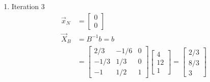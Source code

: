 \documentclass[a4paper,10pt]{article}
\begin{document}
\begin{enumerate}
\begin{enumerate}
{\begin{enumerate}
                    Ratio test 
                    \[
                        \alpha = \min(|-\frac{2}{3}|, |6|, |\frac{8}{3}|) = \frac{2}{3}
                    \]

                    Thus, 
                    \begin{align}
                        \vec{x}^{new} &= \begin{bmatrix} x_2 \\ x_1 \\ x_5 \\ x_3 \\ x_2 \end{bmatrix} \\
                        \vec{B}^{new} &= \begin{bmatrix} 2 & 1 & 0 \\ 2 & 4 & 0 \\ 1 & -1 & 1\end{bmatrix} \\
                        N^{new} &= \begin{bmatrix} 0 & 1 \\ 1 & 0 \\ 0 & 0 \end{bmatrix} \\
                        A^{new} &= \begin{bmatrix} 0 & 1 & 2 & 1 & 0 \\ 1 & 0 & 2 & 4 & 0 \\ 0 & 0 & 1 & -1 & 1 \end{bmatrix}
                    \end{align}

                    The index set of the new basic variables are $\mathcal{B} = \{2,1,5\}$ and the non-basic variables are $\mathcal{N} = \{4,3\}$ 
                
                \item Iteration 3
                    \begin{align}
                        \vec{x}_N &= \begin{bmatrix} 0 \\ 0 \end{bmatrix} \\
                        \vec{X}_B &= B^{-1}b = b \\
                        &= \begin{bmatrix} 2/3 & -1/6 & 0 \\ -1/3 & 1/3 & 0 \\ -1 & 1/2 & 1 \end{bmatrix} \begin{bmatrix} 4 \\ 12 \\ 1 \end{bmatrix} = \begin{bmatrix} 2/3 \\ 8/3 \\ 3 \end{bmatrix}
                    \end{align}


\end{enumerate}}
\end{enumerate}
\end{enumerate}
\end{document}
